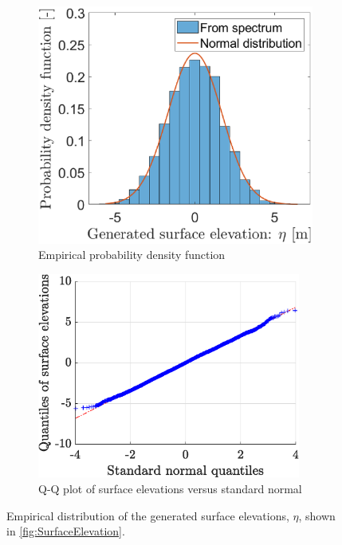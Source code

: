 \begin{figure}[htb]
\begin{subfigure}[t]{.5\textwidth}
    \centering
    \includegraphics[width=.95\textwidth,trim=0cm 0cm 0.0cm 0cm, clip=true]{Figures/Plots/etaIFFTdist}
    \caption{Empirical probability density function}
    \label{fig:etaIFFTHist}
\end{subfigure}%
\begin{subfigure}[t]{.5\textwidth}
    \centering
    \includegraphics[width=0.95\textwidth,trim=0cm 0cm 0cm 0cm, clip=true]{Figures/Plots/etaIFFqqplot}
    \caption{Q-Q plot of surface elevations versus standard normal}
    \label{fig:etaIFFTqqplot}
\end{subfigure}
\caption{Empirical distribution of the generated surface elevations, $\eta$, shown in \cref{fig:SurfaceElevation}.}
\label{fig:etaIFFTDistributions}
\end{figure}

